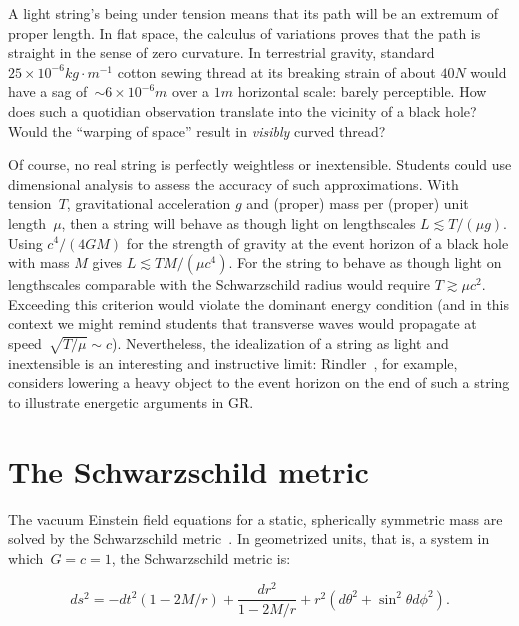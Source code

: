 \documentclass[review]{elsarticle}
\begin{document}
A light string's being under tension means that its path will be an
extremum of proper length.  In flat space, the calculus of variations
proves that the path is straight in the sense of zero curvature.  In
terrestrial gravity, standard $25\times
10^{-6}\unit{kg}\cdot\unit{m}^{-1}$ cotton sewing thread at its breaking
strain of about $40\unit{N}$ would have a sag of~${\sim} 6\times
10^{-6}\unit{m}$ over a $1\unit{m}$ horizontal scale: barely perceptible.
How does such a quotidian observation translate into the vicinity of a
black hole?  Would the ``warping of space'' result in {\em visibly}
curved thread?

Of course, no real string is perfectly weightless or inextensible.
Students could use dimensional analysis to assess the accuracy of such
approximations.  With tension~$T$, gravitational acceleration $g$ and
(proper) mass per (proper) unit length~$\mu$, then a string will
behave as though light on lengthscales $L\lesssim T/\left(\mu
g\right)$.  Using $c^4/\left(4GM\right)$ for the strength of gravity
at the event horizon of a black hole with mass $M$ gives $L\lesssim
TM/\left(\mu c^4\right)$.  For the string to behave as though light on
lengthscales comparable with the Schwarzschild radius would require
$T\gtrsim\mu c^2$.  Exceeding this criterion would violate the
dominant energy condition (and in this context we might remind
students that transverse waves would propagate at
speed~$\sqrt{T/\mu}\sim c$).  Nevertheless, the idealization of a
string as light and inextensible is an interesting and instructive
limit: Rindler~\cite{rindler}, for example, considers lowering a heavy
object to the event horizon on the end of such a string to illustrate
energetic arguments in GR.

\section{The Schwarzschild metric}

The vacuum Einstein field equations for a static, spherically
symmetric mass are solved by the Schwarzschild
metric~\cite{schwarzschild1916}.  In geometrized units, that is, a
system in which~$G=c=1$, the Schwarzschild metric is:

\begin{equation}\label{schwarzschild}
ds^2= -dt^2\left(1-2M/r\right) +\frac{dr^2}{1-2M/r} + r^2\left(d\theta^2 + \sin^2\theta d\phi^2\right).
\end{equation}
\end{document}
